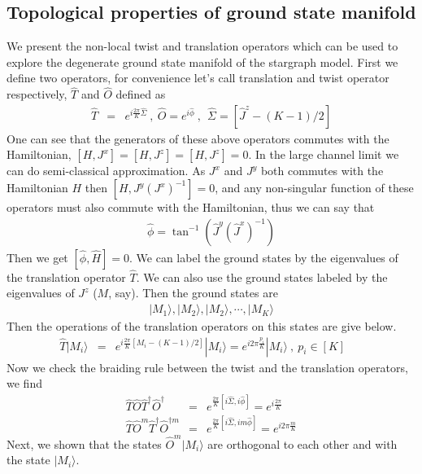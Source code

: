 \documentclass[reprint,prb,superscriptaddress]{revtex4-2}
\begin{document}
\subsection{Topological properties of ground state manifold}
\label{sec:topo_ground_state}
\noindent We present the non-local twist and translation operators which can be used to explore the degenerate ground state manifold of the stargraph model. First we define two operators, for convenience let's call translation and twist operator respectively, $\hat{T}$ and $\hat{O}$ defined as 
\begin{eqnarray}
\hat{T} &=& e^{i\frac{2\pi}{K} \hat{\Sigma}} ~,~\hat{O} = e^{i\hat{\phi}}~,~~\hat{\Sigma}=[\hat{J}^z-(K-1)/2]
\end{eqnarray}
One can see that the generators of these above operators commutes with the Hamiltonian, $[H,J^x]=[H,J^z]=[H,J^z]=0$. In the large channel limit we can do semi-classical approximation. As $J^x$ and $J^y$ both commutes with the Hamiltonian $H$ then $[H,J^y{(J^{x})}^{-1}]=0$, and any non-singular function of these operators must also commute with the Hamiltonian, thus we can say that
\begin{eqnarray}
\hat{\phi}=\tan^{-1}(\hat{J}^y(\hat{J}^x)^{-1})
\end{eqnarray}
Then we get $[\hat{\phi},\hat{H}]=0$. We can label the ground states by the eigenvalues of the translation operator $\hat{T}$. We can also use the ground states labeled by the eigenvalues of $J^z$ ($M$, say). Then the ground states are 
\begin{eqnarray}
|M_1\rangle,|M_2\rangle,|M_2\rangle,\cdots ,|M_K\rangle
\end{eqnarray}
Then the operations of the translation operators on this states are give below.
\begin{eqnarray}
\hat{T}|M_i\rangle &=& e^{i\frac{2\pi}{K} [M_i-(K-1)/2]} |M_i\rangle = e^{i2\pi\frac{p_i}{K} } |M_i\rangle~,~p_i\in[K]~~~~~~~
\end{eqnarray}
Now we check the braiding rule between the twist and the translation operators, we find
\begin{eqnarray}
\hat{T}\hat{O}\hat{T}^{\dagger}\hat{O}^{\dagger} &=& e^{\frac{2\pi }{K}[i\hat{\Sigma},i\hat{\phi}]}=e^{i\frac{2\pi }{K}} \nonumber\\
\hat{T}\hat{O}^m\hat{T}^{\dagger}\hat{O}^{\dagger m} &=& e^{\frac{2\pi }{K}[i\hat{\Sigma},im\hat{\phi}]}=e^{i2\pi \frac{m}{K}}
\end{eqnarray}
Next, we shown that the states $\hat{O}^m |M_i\rangle$ are orthogonal to each other and with the state $|M_i\rangle$.
\end{document}

